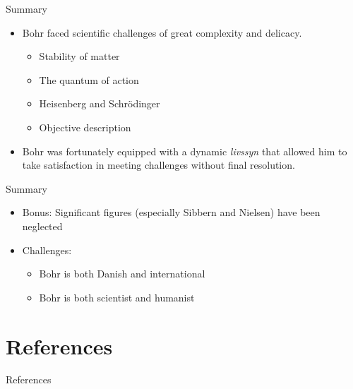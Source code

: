 \documentclass[fleqn]{beamer}
\begin{document}
\begin{frame}{Summary}

  \begin{itemize}
  \item Bohr faced scientific challenges of great complexity and
    delicacy.
    \begin{itemize}
    \item Stability of matter
    \item The quantum of action
    \item Heisenberg and Schr{\"o}dinger
    \item Objective description
    \end{itemize}
  \item Bohr was fortunately equipped with a dynamic \emph{livssyn}
    that allowed him to take satisfaction in meeting challenges
    without final resolution.
  \end{itemize}

\end{frame}

\begin{frame}{Summary}

  \begin{itemize}
  \item Bonus: Significant figures (especially Sibbern and Nielsen)
    have been neglected
  \item Challenges:
    \begin{itemize}
    \item Bohr is both Danish and international
    \item Bohr is both scientist and humanist
    \end{itemize}
  \end{itemize}



\end{frame}




\section{References}

\begin{frame}[allowframebreaks]{References}

\printbibliography[heading=none]

\end{frame}
\end{document}
